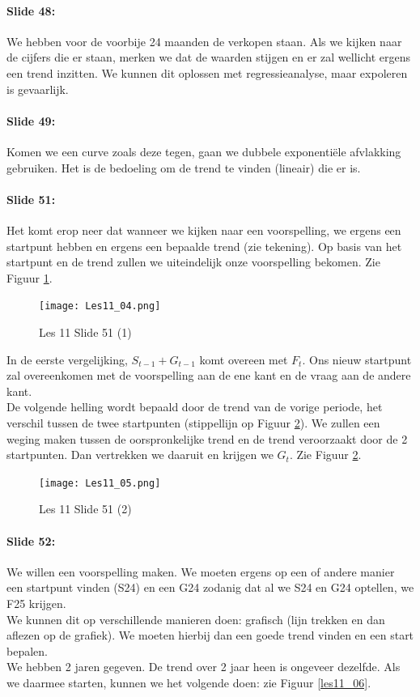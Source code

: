 \documentclass[10pt,a4paper]{report}
\begin{document}
\paragraph{Slide 48:} We hebben voor de voorbije 24 maanden de verkopen staan. Als we kijken naar de cijfers die er staan, merken we dat de waarden stijgen en er zal wellicht ergens een trend inzitten. We kunnen dit oplossen met regressieanalyse, maar expoleren is gevaarlijk.

\paragraph{Slide 49:} Komen we een curve zoals deze tegen, gaan we dubbele exponenti\"ele afvlakking gebruiken. Het is de bedoeling om de trend te vinden (lineair) die er is.

\paragraph{Slide 51:} Het komt erop neer dat wanneer we kijken naar een voorspelling, we ergens een startpunt hebben en ergens een bepaalde trend (zie tekening). Op basis van het startpunt en de trend zullen we uiteindelijk onze voorspelling bekomen. Zie Figuur \ref{les11_04}.\\

\begin{figure}[h!]
\centering
\texttt{[image: Les11\_04.png]}
\caption{Les 11 Slide 51 (1)} 
\label{les11_04}
\end{figure}

In de eerste vergelijking, $S_{t-1} + G_{t-1}$ komt overeen met $F_{t}$. Ons nieuw startpunt zal overeenkomen met de voorspelling aan de ene kant en de vraag aan de andere kant.\\
De volgende helling wordt bepaald door de trend van de vorige periode, het verschil tussen de twee startpunten (stippellijn op Figuur \ref{les11_05}). We zullen een weging maken tussen de oorspronkelijke trend en de trend veroorzaakt door de 2 startpunten. Dan vertrekken we daaruit en krijgen we $G_{t}$. Zie Figuur \ref{les11_05}.

\begin{figure}[h!]
\centering
\texttt{[image: Les11\_05.png]}
\caption{Les 11 Slide 51 (2)} 
\label{les11_05}
\end{figure}

\paragraph{Slide 52:} We willen een voorspelling maken. We moeten ergens op een of andere manier een startpunt vinden (S24) en een G24 zodanig dat al we S24 en G24 optellen, we F25 krijgen.\\
We kunnen dit op verschillende manieren doen: grafisch (lijn trekken en dan aflezen op de grafiek). We moeten hierbij dan een goede trend vinden en een start bepalen.\\
We hebben 2 jaren gegeven. De trend over 2 jaar heen is ongeveer dezelfde. Als we daarmee starten, kunnen we het volgende doen: zie Figuur \ref{les11_06}.\\
\end{document}

